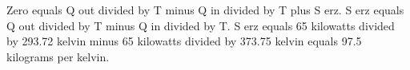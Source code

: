 Zero equals Q out divided by T minus Q in divided by T plus S erz.  
S erz equals Q out divided by T minus Q in divided by T.  
S erz equals 65 kilowatts divided by 293.72 kelvin minus 65 kilowatts divided by 373.75 kelvin equals 97.5 kilograms per kelvin.